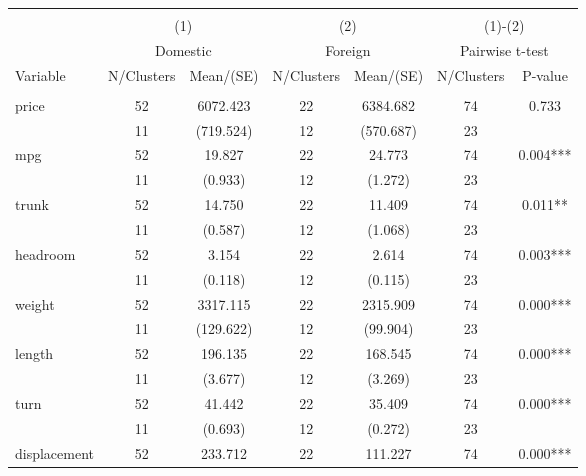 
\begin{tabular}{@{\extracolsep{5pt}}lcccccc}
\\[-1.8ex]\hline \hline \\[-1.8ex]
 & \multicolumn{2}{c}{(1)}  & \multicolumn{2}{c}{(2)}  & \multicolumn{2}{c}{(1)-(2)} \\
 & \multicolumn{2}{c}{Domestic}  & \multicolumn{2}{c}{Foreign}  & \multicolumn{2}{c}{Pairwise t-test}  \\
Variable & N/Clusters & Mean/(SE) & N/Clusters & Mean/(SE) & N/Clusters & P-value \\ \hline \\[-1.8ex] 
price   & 52    & 6072.423    & 22    & 6384.682    & 74    & 0.733   \\
 & 11  & (719.524)  & 12  & (570.687)  & 23  &  \\ [1ex]
mpg   & 52    & 19.827    & 22    & 24.773    & 74    & 0.004***   \\
 & 11  & (0.933)  & 12  & (1.272)  & 23  &  \\ [1ex]
trunk   & 52    & 14.750    & 22    & 11.409    & 74    & 0.011**   \\
 & 11  & (0.587)  & 12  & (1.068)  & 23  &  \\ [1ex]
headroom   & 52    & 3.154    & 22    & 2.614    & 74    & 0.003***   \\
 & 11  & (0.118)  & 12  & (0.115)  & 23  &  \\ [1ex]
weight   & 52    & 3317.115    & 22    & 2315.909    & 74    & 0.000***   \\
 & 11  & (129.622)  & 12  & (99.904)  & 23  &  \\ [1ex]
length   & 52    & 196.135    & 22    & 168.545    & 74    & 0.000***   \\
 & 11  & (3.677)  & 12  & (3.269)  & 23  &  \\ [1ex]
turn   & 52    & 41.442    & 22    & 35.409    & 74    & 0.000***   \\
 & 11  & (0.693)  & 12  & (0.272)  & 23  &  \\ [1ex]
displacement   & 52    & 233.712    & 22    & 111.227    & 74    & 0.000***   \\

\end{tabular}

